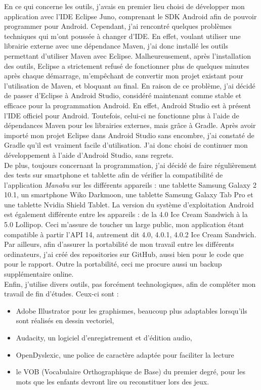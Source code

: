 En ce qui concerne les outils, j'avais en premier lieu choisi de développer mon application avec l'IDE Eclipse Juno, comprenant le SDK Android afin de pouvoir programmer pour Android. Cependant, j'ai rencontré quelques problèmes techniques qui m'ont poussée à changer d'IDE. En effet, voulant utiliser une librairie externe avec une dépendance Maven, j'ai donc installé les outils permettant d'utiliser Maven avec Eclipse. Malheureusement, après l'installation des outils, Eclipse a strictement refusé de fonctionner plus de quelques minutes après chaque démarrage, m'empêchant de convertir mon projet existant pour l'utilisation de Maven, et bloquant au final. En raison de ce problème, j'ai décidé de passer d'Eclipse à Android Studio, considéré maintenant comme stable et efficace pour la programmation Android. En effet, Android Studio est à présent l'IDE officiel pour Android. Toutefois, celui-ci ne fonctionne plus à l'aide de dépendances Maven pour les librairies externes, mais grâce à Gradle. Après avoir importé mon projet Eclipse dans Android Studio sans encombre, j'ai constaté de Gradle qu'il est vraiment facile d'utilisation. J'ai donc choisi de continuer mon développement à l'aide d'Android Studio, sans regrets.\\

De plus, toujours concernant la programmation, j'ai décidé de faire régulièrement des tests sur smartphone et tablette afin de vérifier la compatibilité de l'application \textit{Manabu} sur les différents appareils : une tablette Samsung Galaxy 2 10.1, un smartphone Wiko Darkmoon, une tablette Samsung Galaxy Tab Pro et une tablette Nvidia Shield Tablet. La version du système d'exploitation Android est également différente entre les appareils : de la 4.0 Ice Cream Sandwich à la 5.0 Lollipop. Ceci m'assure de toucher un large public, mon application étant compatible à partir l'API 14, autrement dit 4.0, 4.0.1, 4.0.2 Ice Cream Sandwich. Par ailleurs, afin d'assurer la portabilité de mon travail entre les différents ordinateurs, j'ai créé des repositories sur GitHub, aussi bien pour le code que pour le rapport. Outre la portabilité, ceci me procure aussi un backup supplémentaire online.\\

Enfin, j'utilise divers outils, pas forcément technologiques, afin de compléter mon travail de fin d'études. Ceux-ci sont :
\begin{itemize}
\item Adobe Illustrator pour les graphismes, beaucoup plus adaptables lorsqu'ils sont réalisés en dessin vectoriel,
\item Audacity, un logiciel d'enregistrement et d'édition audio,
\item OpenDyslexic, une police de caractère adaptée pour faciliter la lecture
\item le VOB (Vocabulaire Orthographique de Base) du premier degré, pour les mots que les enfants devront lire ou reconstituer lors des jeux.
\end{itemize} 



